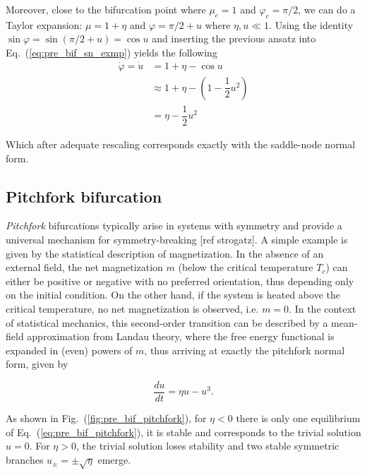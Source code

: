 \begin{exmp}
    Moreover, close to the bifurcation point where $\mu_c = 1$ and $\varphi_c = \pi/2$,
    we can do a Taylor expansion: $\mu = 1 + \eta$ and $\varphi = \pi/2 + u$ 
    where $\eta, u \ll 1$. Using the identity $\sin \varphi = \sin (\pi/2 + u) = \cos u$
    and inserting the previous ansatz into Eq.~(\ref{eq:pre_bif_sn_exmp}) yields
    the following
    \begin{align*}
        \dot{\varphi} = \dot{u} &= 1 + \eta - \cos u \\ 
        &\approx 1 + \eta - (1 - \dfrac12 u^2) \\
        &= \eta - \dfrac12 u^2
    \end{align*}

    Which after adequate rescaling corresponds exactly with the saddle-node
    normal form.
    

\end{exmp}

\subsection{Pitchfork bifurcation}

{\em Pitchfork} bifurcations typically arise in systems with symmetry and 
provide a universal mechanism for symmetry-breaking [ref strogatz]. 
A simple example is given by the statistical description of magnetization. 
In the absence of an external field, the net magnetization $m$ 
(below the critical temperature $T_c$) can either be positive or negative 
with no preferred orientation, thus depending only on the initial condition. On the
other hand, if the system is heated above the critical temperature, no net magnetization
is observed, i.e. $m=0$. In the context of statistical mechanics, this second-order
transition can be described by a mean-field approximation from Landau theory, where
the free energy functional is expanded in (even) powers of $m$, thus arriving at exactly
the pitchfork normal form, given by

\begin{equation}
    \dfrac{du}{dt} = \eta u - u ^ 3.
    \label{eq:pre_bif_pitchfork}
\end{equation}

As shown in Fig.~(\ref{fig:pre_bif_pitchfork}), for $\eta < 0$ there is only one 
equilibrium of Eq.~(\ref{eq:pre_bif_pitchfork}), it is stable and corresponds
to the trivial solution $u=0$. For $\eta > 0$, the trivial solution loses stability
and two stable symmetric branches $u_\pm = \pm \sqrt{\eta}$ emerge. 

